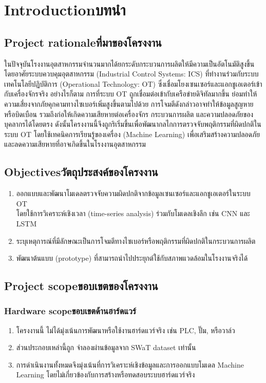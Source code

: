 \chapter{\ifenglish Introduction\else บทนำ\fi}

\section{\ifenglish Project rationale\else ที่มาของโครงงาน\fi}
\hspace{2em} ในปัจจุบันโรงงานอุตสาหกรรมจำนวนมากได้ยกระดับกระบวนการผลิตให้มีความเป็นอัตโนมัติสูงขึ้น \\ โดยอาศัยระบบควบคุมอุตสาหกรรม (Industrial Control Systems: ICS) ที่ทำงานร่วมกับระบบเทคโนโลยีปฏิบัติการ (Operational Technology: OT) ซึ่งเชื่อมโยงเซนเซอร์และแอกชูเอเตอร์เข้ากับเครื่องจักรจริง อย่างไรก็ตาม การที่ระบบ OT ถูกเชื่อมต่อเข้ากับเครือข่ายดิจิทัลมากขึ้น ย่อมทำให้ความเสี่ยงจากภัยคุกคามทางไซเบอร์เพิ่มสูงขึ้นตามไปด้วย การโจมตีดังกล่าวอาจทำให้ข้อมูลสูญหายหรือบิดเบือน รวมถึงก่อให้เกิดความเสียหายต่อเครื่องจักร กระบวนการผลิต และความปลอดภัยของบุคลากรได้โดยตรง ดังนั้นโครงงานนี้จึงถูกริเริ่มขึ้นเพื่อพัฒนากลไกการตรวจจับพฤติกรรมที่ผิดปกติในระบบ OT โดยใช้เทคนิคการเรียนรู้ของเครื่อง (Machine Learning) เพื่อเสริมสร้างความปลอดภัยและลดความเสียหายที่อาจเกิดขึ้นในโรงงานอุตสาหกรรม

\section{\ifenglish Objectives\else วัตถุประสงค์ของโครงงาน\fi}
\begin{enumerate}
    \item ออกแบบและพัฒนาโมเดลตรวจจับความผิดปกติจากข้อมูลเซนเซอร์และแอกชูเอเตอร์ในระบบ OT \\ โดยใช้การวิเคราะห์เชิงเวลา (time-series analysis) ร่วมกับโมเดลเชิงลึก เช่น CNN และ LSTM
    \item ระบุเหตุการณ์ที่มีลักษณะเป็นการโจมตีทางไซเบอร์หรือพฤติกรรมที่ผิดปกติในกระบวนการผลิต
    \item พัฒนาต้นแบบ (prototype) ที่สามารถนำไปประยุกต์ใช้กับสภาพแวดล้อมในโรงงานจริงได้
\end{enumerate}

\section{\ifenglish Project scope\else ขอบเขตของโครงงาน\fi}

\subsection{\ifenglish Hardware scope\else ขอบเขตด้านฮาร์ดแวร์\fi}
\begin{enumerate}
    \item โครงงานนี้ ไม่ได้มุ่งเน้นการพัฒนาหรือใช้งานฮาร์ดแวร์จริง เช่น PLC, ปั๊ม, หรือวาล์ว
    \item ส่วนประกอบเหล่านี้ถูก จำลองผ่านข้อมูลจาก SWaT dataset เท่านั้น
    \item การดำเนินงานทั้งหมดจึงมุ่งเน้นที่การวิเคราะห์เชิงข้อมูลและการออกแบบโมเดล Machine Learning โดยไม่เกี่ยวข้องกับการสร้างหรือทดสอบระบบฮาร์ดแวร์จริง
\end{enumerate}

